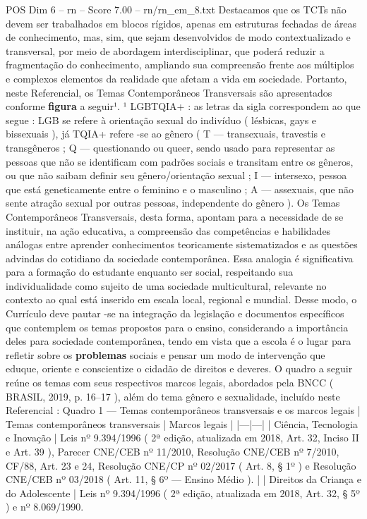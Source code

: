 \begin{textsample}{POS Dim 6 – rn – Score 7.00 – rn/rn\_em\_8.txt}
Destacamos que os TCTs não devem ser trabalhados em blocos rígidos, apenas em estruturas fechadas de áreas de conhecimento, mas, sim, que sejam desenvolvidos de modo contextualizado e transversal, por meio de abordagem interdisciplinar, que poderá reduzir a fragmentação do conhecimento, ampliando sua compreensão frente aos múltiplos e complexos elementos da realidade que afetam a vida em sociedade.
Portanto, neste Referencial, os Temas Contemporâneos Transversais são apresentados conforme \textbf{figura} a seguir¹. ¹ LGBTQIA+ : as letras da sigla correspondem ao que segue : LGB se refere à orientação sexual do indivíduo ( lésbicas, gays e bissexuais ), já TQIA+ refere -se ao gênero ( T — transexuais, travestis e transgêneros ; Q — questionando ou queer, sendo usado para representar as pessoas que não se identificam com padrões sociais e transitam entre os gêneros, ou que não saibam definir seu gênero/orientação sexual ; I — intersexo, pessoa que está geneticamente entre o feminino e o masculino ; A — assexuais, que não sente atração sexual por outras pessoas, independente do gênero ).
Os Temas Contemporâneos Transversais, desta forma, apontam para a necessidade de se instituir, na ação educativa, a compreensão das competências e habilidades análogas entre aprender conhecimentos teoricamente sistematizados e as questões advindas do cotidiano da sociedade contemporânea.
Essa analogia é significativa para a formação do estudante enquanto ser social, respeitando sua individualidade como sujeito de uma sociedade multicultural, relevante no contexto ao qual está inserido em escala local, regional e mundial.
Desse modo, o Currículo deve pautar -se na integração da legislação e documentos específicos que contemplem os temas propostos para o ensino, considerando a importância deles para sociedade contemporânea, tendo em vista que a escola é o lugar para refletir sobre os \textbf{problemas} sociais e pensar um modo de intervenção que eduque, oriente e conscientize o cidadão de direitos e deveres.
O quadro a seguir reúne os temas com seus respectivos marcos legais, abordados pela BNCC ( BRASIL, 2019, p. 16–17 ), além do tema gênero e sexualidade, incluído neste Referencial : Quadro 1 — Temas contemporâneos transversais e os marcos legais | Temas contemporâneos transversais | Marcos legais | |---|---| | Ciência, Tecnologia e Inovação | Leis nº 9.394/1996 ( 2ª edição, atualizada em 2018, Art. 32, Inciso II e Art. 39 ), Parecer CNE/CEB nº 11/2010, Resolução CNE/CEB nº 7/2010, CF/88, Art. 23 e 24, Resolução CNE/CP nº 02/2017 ( Art. 8, § 1º ) e Resolução CNE/CEB nº 03/2018 ( Art. 11, § 6º — Ensino Médio ). | | Direitos da Criança e do Adolescente | Leis nº 9.394/1996 ( 2ª edição, atualizada em 2018, Art. 32, § 5º ) e nº 8.069/1990.

\end{textsample}
